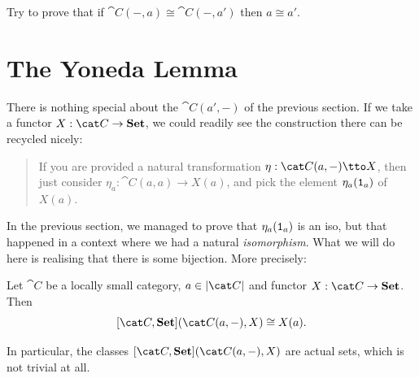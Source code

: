 \begin{exercise}
  Try to prove that if \(\cat C(-, a) \cong \cat C(-, a')\) then \(a \cong a'\).
\end{exercise}



\section{The Yoneda Lemma}

There is nothing special about the \(\cat C(a', -)\) of the previous
section. If we take a functor \(X : \cat C \to \Set\), we could readily
see the construction there can be recycled nicely:
\begin{quotation}
  If you are provided a natural transformation
  \(\eta : \cat C(a, -) \tto X\), then just consider
  \(\eta_a : \cat C(a, a) \to X(a)\), and pick the element
  \(\eta_a(\mathtt 1_a)\) of \(X(a)\).
\end{quotation}
In the previous section, we managed to prove that \(\eta_a(\mathtt 1_a)\) is an
iso, but that happened in a context where we had a natural {\em
  isomorphism}. What we will do here is realising that there is some
bijection. More precisely:

\begin{lemma}\label{lemma:YonedaLemmaLemma}
  Let \(\cat C\) be a locally small category, \(a \in \obj{\cat C}\) and
  functor \(X : \cat C \to \Set\). Then
  \begin{equation}
    \label{eqn:YonedaBijection}
    [\cat C, \Set](\cat C(a, -), X) \cong X(a) .
  \end{equation}
\end{lemma}

In particular, the classes \([\cat C, \Set](\cat C(a, -), X)\) are
actual sets, which is not trivial at all.

